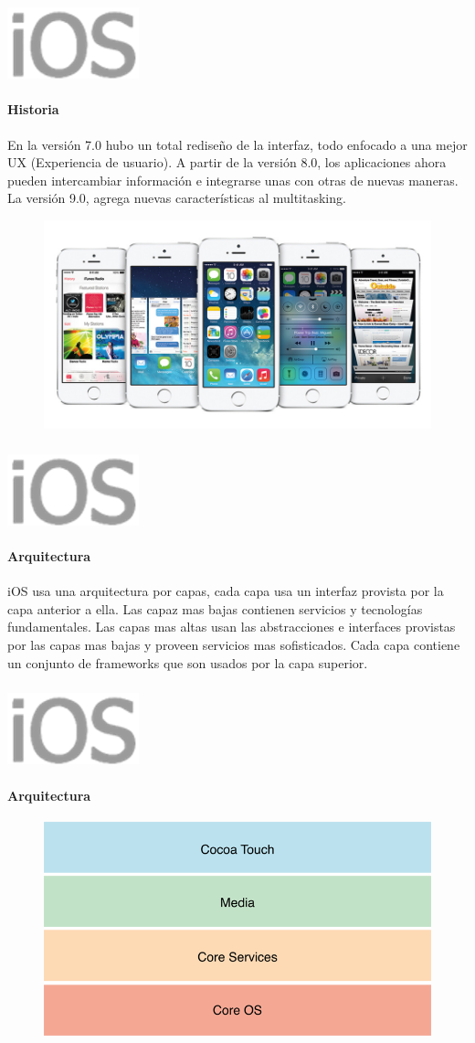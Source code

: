\documentclass{beamer}
\newcommand*{\ioslogo}{\includegraphics[scale=0.25]{img/logo2.png} \ }%
\begin{document}
\begin{frame}
\frametitle{\ioslogo}
\framesubtitle{Historia}
	
	En la versión 7.0 hubo un total rediseño de la interfaz, todo enfocado a una mejor UX (Experiencia de usuario). A partir de la versión 8.0, los aplicaciones ahora pueden intercambiar información e integrarse unas con otras de nuevas maneras. La versión 9.0, agrega nuevas características al multitasking.
	

	\begin{figure}[h]
		\centering
		\includegraphics[scale=1.3]{img/ios-7.jpg}
	\end{figure}
\end{frame}


\begin{frame}
\frametitle{\ioslogo}
\framesubtitle{Arquitectura}
	
	iOS usa una arquitectura por capas, cada capa usa un interfaz provista por la capa anterior a ella. Las capaz mas bajas contienen servicios y tecnologías fundamentales. Las capas mas altas usan las abstracciones e interfaces provistas por las capas mas bajas y proveen servicios mas sofisticados. Cada capa contiene un conjunto de frameworks que son usados por la capa superior.
\end{frame}

\begin{frame}
	\frametitle{\ioslogo}
	\framesubtitle{Arquitectura}
	
	\begin{figure}[h]
		\centering
		\includegraphics[scale=0.4]{img/layers.png}
	\end{figure}
\end{frame}
\end{document}
